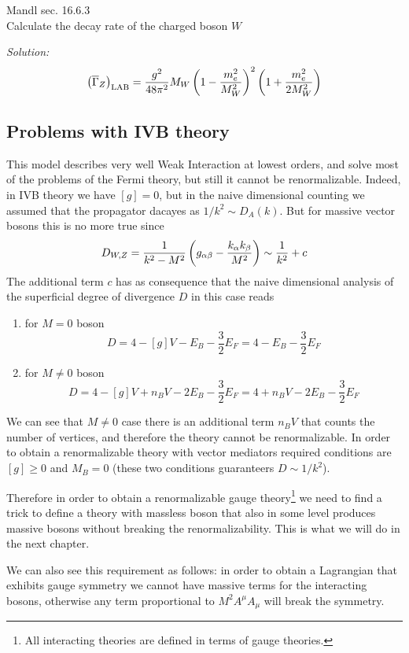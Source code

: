 \documentclass[TheoreticalPhy_ModB.tex]{subfiles}
\begin{document}
\begin{exercise}

\textsf{Mandl sec. 16.6.3}\\

Calculate the decay rate of the charged boson $W$ 

\textit{Solution:}
\[\left(\overline\Gamma_Z\right)_{\text{LAB}}=\frac{g^2}{48\pi^2}M_W\left(1-\frac{m_e^2}{M_W^2}\right)^2\left(1+\frac{m_e^2}{2M_W^2}\right)\]
\end{exercise}

\subsection{Problems with IVB theory}

This model describes very well Weak Interaction at lowest orders, and solve most of the problems of the Fermi theory, but still it cannot be renormalizable. Indeed, in IVB theory we have $[g]=0$, but in the naive dimensional counting we assumed that the propagator dacayes as $1/k^2\sim D_A(k)$. But for massive vector bosons this is no more true since
\[D_{W,Z}=\frac1{k^2-M^2}\left(g_{\alpha\beta}-\frac{k_\alpha k_\beta}{M^2}\right)\sim\frac1{k^2}+c\]
The additional term $c$ has as consequence that the naive dimensional analysis of the superficial degree of divergence $D$ in this case reads
\begin{enumerate}[noitemsep]
\item for $M=0$ boson \[D=4-[g]V-E_B-\frac32E_F=4-E_B-\frac32E_F\]
\item for $M\neq0$ boson \[D=4-[g]V+n_BV-2E_B-\frac32E_F=4+n_BV-2E_B-\frac32E_F\]
\end{enumerate}

We can see that $M\neq0$ case there is an additional term $n_BV$ that counts the number of vertices, and therefore the theory cannot be renormalizable. In order to obtain a renormalizable theory with vector mediators required conditions are $[g]\geq0$ and $M_B=0$ (these two conditions guaranteers $D\sim1/k^2$).

Therefore in order to obtain a renormalizable gauge theory\footnote{All interacting theories are defined in terms of gauge theories.} we need to find a trick to define a theory with massless boson that also in some level produces massive bosons without breaking the renormalizability. This is what we will do in the next chapter.

We can also see this requirement as follows: in order to obtain a Lagrangian that exhibits gauge symmetry we cannot have massive terms for the interacting bosons, otherwise any term proportional to $M^2A^\mu A_\mu$ will break the symmetry.
\end{document}
